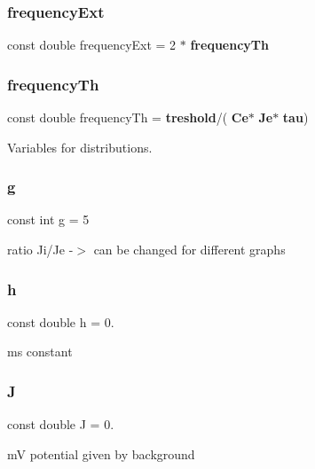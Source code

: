 \subsubsection{frequency\+Ext}
{\footnotesize\ttfamily const double frequency\+Ext = 2 $\ast$ \textbf{ frequency\+Th}}

\mbox{\label{constants_8h_a35bcf347fb4545809fe41b549784498a}} 
\subsubsection{frequency\+Th}
{\footnotesize\ttfamily const double frequency\+Th = \textbf{ treshold}/(\textbf{ Ce}$\ast$\textbf{ Je}$\ast$\textbf{ tau})}



Variables for distributions. 

\mbox{\label{constants_8h_aece2eeedca2f58e31a680503a9b7e972}} 
\subsubsection{g}
{\footnotesize\ttfamily const int g = 5}



ratio Ji/\+Je -\/$>$ can be changed for different graphs 

\mbox{\label{constants_8h_aa6e8e201edf24007dc075bfef6e8210c}} 
\subsubsection{h}
{\footnotesize\ttfamily const double h = 0.}



ms constant 

\mbox{\label{constants_8h_abb4f6430d98825c1e2344074ee09c57a}} 
\subsubsection{J}
{\footnotesize\ttfamily const double J = 0.}



mV potential given by background 

\mbox{\label{constants_8h_a39898975b4c6d6a29e121e7e4b350a2c}} 
